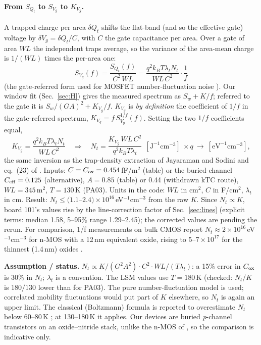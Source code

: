 \documentclass[10pt,a4paper]{article}
\newcommand{\caveat}[1]{\par\smallskip\noindent\colorbox{orange!10}{\parbox{\dimexpr\linewidth-2\fboxsep}{\small\textbf{Assumption / status.} #1}}\par\smallskip}
\begin{document}
\paragraph{From $S_{Q_t}$ to $S_{V_g}$ to $K_{V_g}$.} A trapped charge per area $\delta Q_t$ shifts the flat-band (and so
the effective gate) voltage by $\delta V_g=\delta Q_t/C$, with $C$ the gate capacitance per area. Over a gate of area
$WL$ the independent traps average, so the variance of the area-mean charge is $1/(WL)$ times the per-area one:
\begin{equation}
S_{V_g}(f)=\frac{S_{Q_t}(f)}{C^2\,WL}=\frac{q^2k_BT\lambda_tN_t}{WL\,C^2}\cdot\frac1f
\end{equation}
(the gate-referred form used for MOSFET number-fluctuation noise \cite{christensson1968,ghibaudo1991}). Our window fit
(Sec.~\ref{sec:H}) gives the measured spectrum as $S_w+K/f$; referred to the gate it is $S_w/(GA)^2+K_{V_g}/f$.
$K_{V_g}$ is \emph{by definition} the coefficient of $1/f$ in the gate-referred spectrum, $K_{V_g}=f\,S^{1/f}_{V_g}(f)$.
Setting the two $1/f$ coefficients equal,
\begin{equation}
K_{V_g}=\frac{q^2k_BT\lambda_tN_t}{WL\,C^2}\quad\Rightarrow\quad
\boxed{N_t=\frac{K_{V_g}\,WL\,C^2}{q^2k_BT\lambda_t}}\ \ [\text{J}^{-1}\text{cm}^{-3}]\ \times q\ \to\ [\text{eV}^{-1}\text{cm}^{-3}],
\end{equation}
the same inversion as the trap-density extraction of Jayaraman and Sodini \cite{jayaraman1989} and eq.~(23) of
\cite{ghibaudo2022}. Inputs: $C=C_{\rm ox}=0.454$\,fF/\textmu m$^2$ (table) or the buried-channel $C_{\rm eff}=0.125$
(alternative), $A=0.85$ (table) or 0.44 (withdrawn kTC route), $WL=345$\,\textmu m$^2$, $T=130$\,K (PA03). Units in the
code: $WL$ in cm$^2$, $C$ in F/cm$^2$, $\lambda_t$ in cm. Result: $N_t\le(1.1$--$2.4)\times10^{16}$\,eV$^{-1}$cm$^{-3}$
from the raw $K$. Since $N_t\propto K$, board 101's values rise by the line-correction factor of Sec.~\ref{sec:lines}
(explicit terms: median 1.58, 5--95\% range 1.29--2.45); the corrected values are pending the rerun.
For comparison, 1/f measurements on bulk CMOS report $N_t\approx2\times10^{16}$\,eV$^{-1}$cm$^{-3}$ for n-MOS with a
12\,nm equivalent oxide, rising to $5$--$7\times10^{17}$ for the thinnest (1.4\,nm) oxides \cite{ioannidis2014}.
\caveat{$N_t\propto K/(G^2A^2)\cdot C^2\cdot WL/(T\lambda_t)$: a 15\% error in $C_{\rm ox}$ is 30\% in $N_t$;
$\lambda_t$ is a convention. The LSM values use $T=180$\,K (checked: $N_t/K$ is $180/130$ lower than for PA03).
The pure number-fluctuation model is used; correlated mobility fluctuations \cite{hung1990,ghibaudo1991} would put part
of $K$ elsewhere, so $N_t$ is again an upper limit. The classical (Boltzmann) formula is reported to overestimate $N_t$
below 60--80\,K \cite{ghibaudo2022}; at 130--180\,K it applies. Our devices are buried \emph{p}-channel transistors on
an oxide--nitride stack, unlike the n-MOS of \cite{ioannidis2014}, so the comparison is indicative only.}
\end{document}
